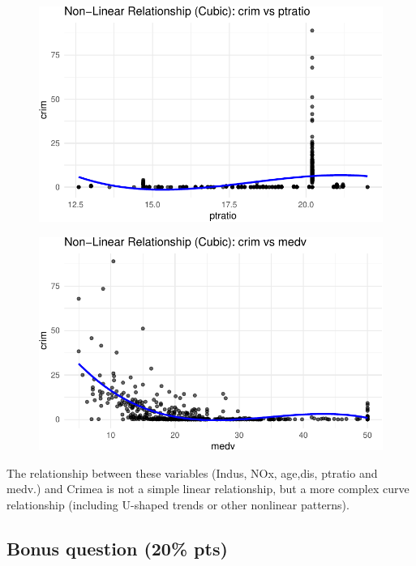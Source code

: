\documentclass[
]{article}
\begin{document}
\begin{figure}[H]

{\centering \includegraphics{hw1_files/figure-pdf/unnamed-chunk-20-5.pdf}

}

\end{figure}

\begin{figure}[H]

{\centering \includegraphics{hw1_files/figure-pdf/unnamed-chunk-20-6.pdf}

}

\end{figure}

The relationship between these variables (Indus, NOx, age,dis, ptratio
and medv.) and Crimea is not a simple linear relationship, but a more
complex curve relationship (including U-shaped trends or other nonlinear
patterns).

\hypertarget{bonus-question-20-pts}{%
\subsection{Bonus question (20\% pts)}\label{bonus-question-20-pts}}
\end{document}
